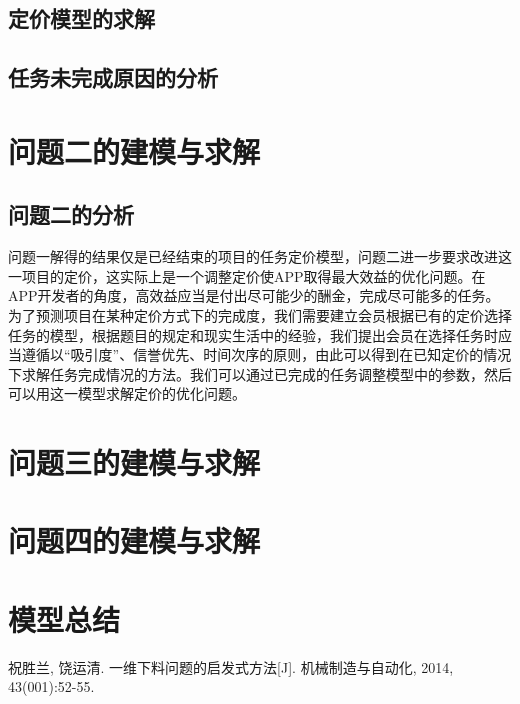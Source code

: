 \documentclass[withoutpreface,bwprint]{cumcmthesis} %
\begin{document}
\subsubsection{}

\subsection{定价模型的求解}

\subsection{任务未完成原因的分析}

\section{问题二的建模与求解}

\subsection{问题二的分析}
问题一解得的结果仅是已经结束的项目的任务定价模型，问题二进一步要求改进这一项目的定价，这实际上是一个调整定价使APP取得最大效益的优化问题。在APP开发者的角度，高效益应当是付出尽可能少的酬金，完成尽可能多的任务。为了预测项目在某种定价方式下的完成度，我们需要建立会员根据已有的定价选择任务的模型，根据题目的规定和现实生活中的经验，我们提出会员在选择任务时应当遵循以“吸引度”、信誉优先、时间次序的原则，由此可以得到在已知定价的情况下求解任务完成情况的方法。我们可以通过已完成的任务调整模型中的参数，然后可以用这一模型求解定价的优化问题。

\section{问题三的建模与求解}

\section{问题四的建模与求解}

\section{模型总结}

\begin{thebibliography}{9}%
    祝胜兰, 饶运清. 一维下料问题的启发式方法[J]. 机械制造与自动化, 2014, 43(001):52-55.
\end{thebibliography}

\begin{appendices}
\end{appendices}
\end{document}
